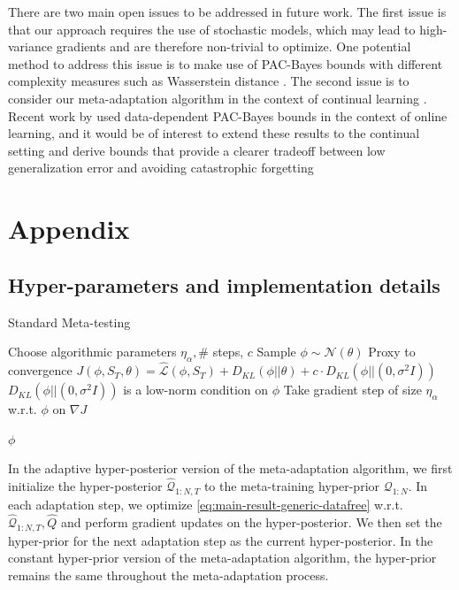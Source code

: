 \documentclass{article} %
\theoremstyle{definition}
\begin{document}
There are two main open issues to be addressed in future work. 
The first issue is that our approach requires the use of stochastic models, which may lead to high-variance gradients and are therefore non-trivial to optimize. One potential method to address this issue is to make use of PAC-Bayes bounds with different complexity measures such as Wasserstein distance \citep{Ohnishi2021, Amit2022}.
The second issue is to consider our meta-adaptation algorithm in the context of continual learning \citep{Kirkpatrick2017}. Recent work by \citet{Haddouche2022} used data-dependent PAC-Bayes bounds in the context of online learning, and it would be of interest to extend these results to the continual setting and derive bounds that provide a clearer tradeoff between low generalization error and avoiding catastrophic forgetting

%



\clearpage
\appendix 
\section{Appendix}
\label{sec:appendix}

\subsection{Hyper-parameters and implementation details} \label{append:hyper-params}

\begin{algorithm}[H]
	\caption{Standard Meta-testing}
	\small
	\begin{algorithmic}
		\State Choose algorithmic parameters $\eta_\alpha, \#$ steps, $c$
		\State Sample $\phi\sim \mathcal{N}(\theta)$
		 \Comment Proxy to convergence
			\State $J(\phi, S_T,\theta)=\hat{\mathcal{L}}(\phi, S_T) + D_{KL}(\phi||\theta) + c\cdot D_{KL}(\phi||(0,\sigma^2 I))$ \Comment $D_{KL}(\phi||(0,\sigma^2 I))$ is a low-norm condition on $\phi$
			\State  Take gradient step of size $\eta_\alpha$ w.r.t.\! $\phi$ on $\nabla J$

		\EndWhile
		\State \Return $\phi$
		\EndFunction
	\end{algorithmic}
\end{algorithm}

In the adaptive hyper-posterior version of the meta-adaptation algorithm, we first initialize the hyper-posterior $\hat{\mathcal{Q}}_{1:N, T}$ to the meta-training hyper-prior $\mathcal{Q}_{1:N}$. In each adaptation step, we optimize \eqref{eq:main-result-generic-datafree} w.r.t.\! $\hat{\mathcal{Q}}_{1:N, T},\hat{Q}$ and perform gradient updates on the hyper-posterior. We then set the hyper-prior for the next adaptation step as the current hyper-posterior.
In the constant hyper-prior version of the meta-adaptation algorithm, the hyper-prior remains the same throughout the meta-adaptation process.
\end{document}
